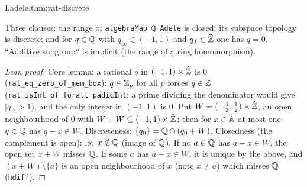 \begin{theorem}[$\Q$ is discrete in $\A$]
\end{theorem}
\begin{tfformal}{I.adele.thm:rat-discrete}
\begin{tffidelity}
Three clauses: the range of \texttt{algebraMap ℚ Adele} is closed; its subspace topology is discrete; and for $q\in\mathbb{Q}$ with $q_\infty\in(-1,1)$ and $q_f\in\widehat{\mathbb{Z}}$ one has $q=0$. ``Additive subgroup'' is implicit (the range of a ring homomorphism).
\end{tffidelity}
\end{tfformal}
\begin{proof}[Lean proof]
Core lemma: a rational $q$ in $(-1,1)\times\hat{\mathbb{Z}}$ is $0$ (\texttt{rat\_eq\_zero\_of\_mem\_box}): $q\in\mathbb{Z}_p$ for all $p$ forces $q\in\mathbb{Z}$ (\texttt{rat\_isInt\_of\_forall\_padicInt}: a prime dividing the denominator would give $|q|_\ell>1$), and the only integer in $(-1,1)$ is $0$. Put $W=(-\tfrac12,\tfrac12)\times\hat{\mathbb{Z}}$, an open neighbourhood of $0$ with $W-W\subseteq(-1,1)\times\hat{\mathbb{Z}}$; then for $x\in\mathbb{A}$ at most one $q\in\mathbb{Q}$ has $q-x\in W$. Discreteness: $\{q_0\}=\mathbb{Q}\cap(q_0+W)$. Closedness (the complement is open): let $x\notin\mathbb{Q}$ (image of $\Q$). If no $a\in\mathbb{Q}$ has $a-x\in W$, the open set $x+W$ misses $\Q$. If some $a$ has $a-x\in W$, it is unique by the above, and $(x+W)\setminus\{a\}$ is an open neighbourhood of $x$ (note $x\ne a$) which misses $\Q$ (\texttt{hdiff}).
\end{proof}

